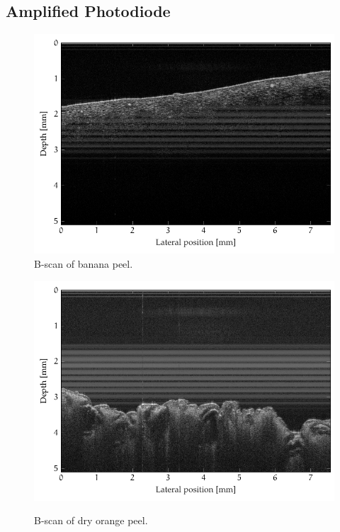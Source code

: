 \subsection{Amplified Photodiode}



\begin{figure}[hbt]
	\centering
	\includegraphics[width=\linewidth]{gfx/tikz/axsun/banana-peel}
	\caption{B-scan of banana peel.}\label{fig:banana-peel}
\end{figure}%
\begin{figure}[hbt]
	\myfloatalign
	{\includegraphics[width=\linewidth]{gfx/tikz/axsun/dry-orange-peel}}
	\caption{B-scan of dry orange peel.}\label{fig:dry-orange-peel}
\end{figure}%

